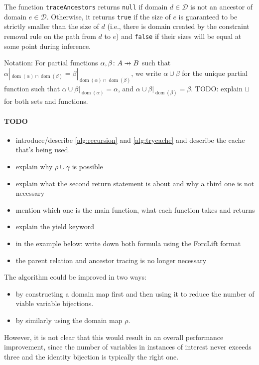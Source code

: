 \documentclass{article}
\theoremstyle{definition}
\theoremstyle{remark}
\newcommand\pfun{\mathrel{\ooalign{\hfil$\mapstochar\mkern5mu$\hfil\cr$\to$\cr}}}
\DeclareMathOperator{\dom}{dom}
\begin{document}
The function \texttt{traceAncestors} returns \texttt{null} if domain $d \in \mathcal{D}$ is not an ancestor of domain $e \in \mathcal{D}$. Otherwise, it returns \texttt{true} if the size of $e$ is guaranteed to be strictly smaller than the size of $d$ (i.e., there is domain created by the constraint removal rule on the path from $d$ to $e$) and \texttt{false} if their sizes will be equal at some point during inference.

Notation: For partial functions $\alpha, \beta\colon A \pfun B$ such that $\alpha|_{\dom(\alpha) \cap \dom(\beta)} = \beta|_{\dom(\alpha) \cap \dom(\beta)}$, we write $\alpha \cup \beta$ for the unique partial function such that $\alpha \cup \beta|_{\dom(\alpha)} = \alpha$, and $\alpha \cup \beta|_{\dom(\beta)} = \beta$. TODO: explain $\sqcup$ for both sets and functions.

\paragraph{TODO}
\begin{itemize}
\item introduce/describe \cref{alg:recursion} and \cref{alg:trycache} and describe the cache that's being used.
\item explain why $\rho \cup \gamma$ is possible
\item explain what the second return statement is about and why a third one is not necessary
\item mention which one is the main function, what each function takes and returns
\item explain the yield keyword
\item in the example below: write down both formula using the ForcLift format
\item the parent relation and ancestor tracing is no longer necessary
\end{itemize}

The algorithm could be improved in two ways:
\begin{itemize}
\item by constructing a domain map first and then using it to reduce the number of viable variable bijections.
\item by similarly using the domain map $\rho$.
\end{itemize}
However, it is not clear that this would result in an overall performance improvement, since the number of variables in instances of interest never exceeds three and the identity bijection is typically the right one.
\end{document}
